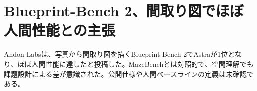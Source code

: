 \section{Blueprint-Bench 2、間取り図でほぼ人間性能との主張}
Andon Labsは、写真から間取り図を描くBlueprint-Bench 2でAstraが1位となり、ほぼ人間性能に達したと投稿した。MazeBenchとは対照的で、空間理解でも課題設計による差が意識された。公開仕様や人間ベースラインの定義は未確認である。
